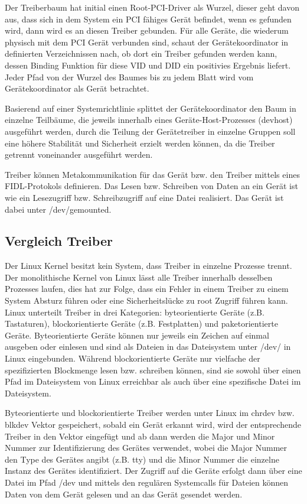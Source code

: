 \documentclass[a4paper]{scrartcl}
\begin{document}
Der Treiberbaum hat initial einen Root-PCI-Driver als Wurzel, dieser geht davon aus, dass sich in dem System ein PCI fähiges Gerät befindet, wenn es gefunden wird, dann wird es an diesen Treiber gebunden. Für alle Geräte, die wiederum physisch mit dem PCI Gerät verbunden sind, schaut der Gerätekoordinator in definierten Verzeichnissen nach, ob dort ein Treiber gefunden werden kann, dessen Binding Funktion für diese VID und DID ein positivies Ergebnis liefert. Jeder Pfad von der Wurzel des Baumes bis zu jedem Blatt wird vom Gerätekoordinator als Gerät betrachtet.

Basierend auf einer Systemrichtlinie splittet der Gerätekoordinator den Baum in einzelne Teilbäume, die jeweils innerhalb eines Geräte-Host-Prozesses (devhost) ausgeführt werden, durch die Teilung der Gerätetreiber in einzelne Gruppen soll eine höhere Stabilität und Sicherheit erzielt werden können, da die Treiber getrennt voneinander ausgeführt werden.

Treiber können Metakommunikation für das Gerät bzw. den Treiber mittels eines FIDL-Protokols definieren. Das Lesen bzw. Schreiben von Daten an ein Gerät ist wie ein Lesezugriff bzw. Schreibzugriff auf eine Datei realisiert. Das Gerät ist dabei unter /dev/gemounted.
\subsection{Vergleich Treiber}
Der Linux Kernel besitzt kein System, dass Treiber in einzelne Prozesse trennt. Der monolithische Kernel von Linux lässt alle Treiber innerhalb desselben Prozesses laufen, dies hat zur Folge, dass ein Fehler in einem Treiber zu einem System Absturz führen oder eine Sicherheitslücke zu root Zugriff führen kann. Linux unterteilt Treiber in drei Kategorien: byteorientierte Geräte (z.B. Tastaturen), blockorientierte Geräte (z.B. Festplatten) und paketorientierte Geräte. Byteorientierte Geräte können nur jeweils ein Zeichen auf einmal ausgeben oder einlesen und sind als Dateien in das Dateisystem unter /dev/ in Linux eingebunden. Während blockorientierte Geräte nur vielfache der spezifizierten Blockmenge lesen bzw. schreiben können, sind sie sowohl über einen Pfad im Dateisystem von Linux erreichbar als auch über eine spezifische Datei im Dateisystem. 

Byteorientierte und blockorientierte Treiber werden unter Linux im chrdev bzw. blkdev Vektor gespeichert, sobald ein Gerät erkannt wird, wird der entsprechende Treiber in den Vektor eingefügt und ab dann werden die Major und Minor Nummer zur Identifizierung des Gerätes verwendet, wobei die Major Nummer den Type des Gerätes angibt (z.B. tty) und die Minor Nummer die einzelne Instanz des Gerätes identifiziert. Der Zugriff auf die Geräte erfolgt dann über eine Datei im Pfad /dev und mittels den regulären Systemcalls für Dateien können Daten von dem Gerät gelesen und an das Gerät gesendet werden.
\end{document}
